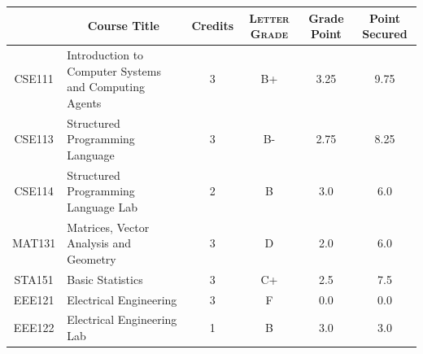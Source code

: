 \documentclass[11pt]{article}
\newcommand*{\numtwo}[1]{\pgfmathprintnumber[
                    fixed, precision=2, fixed zerofill=true]{#1}}
\begin{document}
                \begin{center}
                    \renewcommand{\arraystretch}{1.08}
                    
                \begin{tabular}{|c|l|c|>{\scshape}c|c|c|}
                \hline  \rule[-1ex]{0pt}{3.5ex} {\centering{\bf Course Code}} &  \multicolumn{1}{c|}{\textbf{Course Title}}  & {\bf Credits} & {\bf Letter Grade} & {\bf Grade Point} & {\bf Point Secured}  \\ 
                \hline   CSE111 &  Introduction to Computer Systems and Computing Agents		 & 3 & B+ & 3.25 & 9.75 \\ %
                \hline   CSE113 &  Structured Programming Language		 & 3 & B- & 2.75 & 8.25 \\ %
                \hline   CSE114 &  Structured Programming Language Lab		 & 2 & B & 3.0 & 6.0 \\ %
                \hline   MAT131 &  Matrices, Vector Analysis and Geometry		 & 3 & D & 2.0 & 6.0 \\ %
                \hline   STA151 &  Basic Statistics		 & 3 & C+ & 2.5 & 7.5 \\ %
                \hline   EEE121 &  Electrical Engineering		 & 3 & F & 0.0 & 0.0 \\ %
                \hline   EEE122 &  Electrical Engineering Lab		 & 1 & B & 3.0 & 3.0 \\ %

\hline                %
                \end{tabular}
                \end{center}
                \renewcommand{\arraystretch}{1.03}
\end{document}

